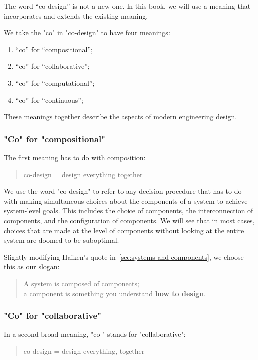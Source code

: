 The word ``co-design'' is not a new one. In this book, we will use 
a meaning that incorporates and extends the existing meaning.

We take the "co" in "co-design" to have four meanings:
\begin{enumerate}
    \item ``co'' for ``compositional'';
    \item ``co'' for ``collaborative'';
    \item  ``co'' for ``computational'';
    \item   ``co'' for ``continuous'';
\end{enumerate}
These meanings together describe the aspects of modern engineering design.


\subsubsection{"Co" for "compositional"}

The first meaning has to do with composition:

\begin{quote}
     co-design = design everything together
\end{quote}

We use the word "co-design" to refer to any decision procedure that has to do with making
simultaneous choices about the components of a system  to achieve system-level
goals. This includes the choice of components, the interconnection of components, and the configuration of components. We will see that in most cases, choices that are made at the level of components without looking at the entire system are doomed to be suboptimal.


Slightly modifying Haiken's quote in~\cref{sec:systems-and-components}, we choose this as our slogan:

\begin{quote}
     A system is composed of components;\\
       a component is something you understand
       \textbf{how to design}.
\end{quote}

\subsubsection{"Co" for "collaborative"}

In a second broad meaning, "co-" stands for "collaborative":

\begin{quote}
    co-design = design everything, together
\end{quote}



